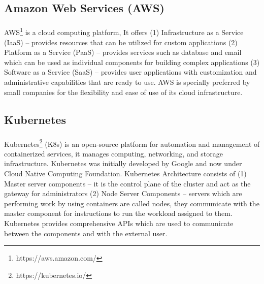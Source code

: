 \subsection{Amazon Web Services (AWS)}

\paragraph{}
AWS\footnote{https://aws.amazon.com/} is a cloud computing platform, It offers (1) Infrastructure as a Service (IaaS) -- provides resources that can be utilized for custom applications (2) Platform as a Service (PaaS) -- provides services such as database and email which can be used as individual components for building complex applications (3) Software as a Service (SaaS) -- provides user applications with customization and administrative capabilities that are ready to use. AWS is specially preferred by small companies for the flexibility and ease of use of its cloud infrastructure.

\subsection{Kubernetes}

\paragraph{}
Kubernetes\footnote{https://kubernetes.io/} (K8s) is an open-source platform for automation and management of containerized services, it manages computing, networking, and storage infrastructure. Kubernetes was initially developed by Google and now under Cloud Native Computing Foundation. Kubernetes Architecture consists of (1) Master server components -- it is the control plane of the cluster and act as the gateway for  administrators (2) Node Server Components -- servers which are performing work by using containers are called nodes, they communicate with the master component for instructions to run the workload assigned to them. Kubernetes provides comprehensive APIs which are used to communicate between the components and with the external user.


